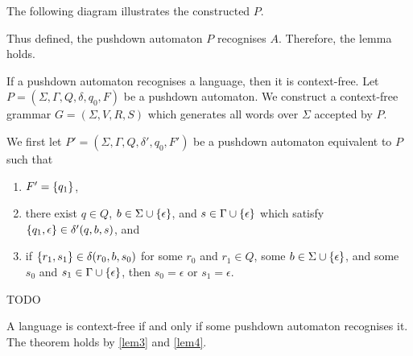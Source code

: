     The following diagram illustrates the constructed \(P\).
    \begin{figure}[!h]
        \centering
    \end{figure}

    Thus defined, the pushdown automaton \(P\) recognises \(A\). Therefore, the
    lemma holds.
\Epr

\Blm
    \label{lem4}
    If a pushdown automaton recognises a language, then it is context-free.
\Elm
\Bpr
    Let \(P = (\Sigma, \Gamma, Q, \delta, q_0, F)\) be a pushdown automaton. We
    construct a context-free grammar \(G = (\Sigma, V, R, S)\) which generates
    all words over \(\Sigma\) accepted by \(P\).

    We first let \(P' = (\Sigma, \Gamma, Q, \delta', q_0, F')\) be a pushdown
    automaton equivalent to \(P\) such that
    \begin{enumerate}
        \item \(F' = \{q_1\}\),
        \item there exist \(q \in Q\), \(b \in \Sigma \cup \{\epsilon\}\), and
        \(s \in \Gamma \cup \{\epsilon\}\) which satisfy \(\{q_1, \epsilon\}
        \in \delta'(q, b, s)\), and
        \item if \(\{r_1, s_1\} \in \delta(r_0, b, s_0)\) for some \(r_0\) and
        \(r_1 \in Q\), some \(b \in \Sigma \cup \{\epsilon\}\), and some
        \(s_0\) and \(s_1 \in \Gamma \cup \{\epsilon\}\), then \(s_0 =
        \epsilon\) or \(s_1 = \epsilon\).
    \end{enumerate}

    TODO
\Epr

\Bth
    A language is context-free if and only if some pushdown automaton recognises
    it.
\Eth
\Bpr
    The theorem holds by \autoref{lem3} and \autoref{lem4}.
\Epr

